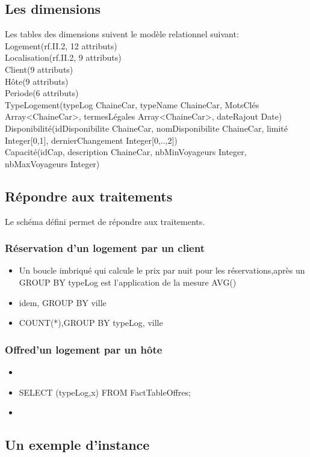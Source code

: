 \documentclass[11pt]{article}
\begin{document}
\subsection{Les dimensions}
Les tables des dimensions suivent le modèle relationnel suivant:\\
Logement(rf.II.2, 12 attributs)\\
Localisation(rf.II.2, 9 attributs)\\
Client(9 attributs)\\
Hôte(9 attributs)\\
Periode(6 attributs)\\
TypeLogement(typeLog ChaineCar, typeName ChaineCar, MotsClés Array<ChaineCar>, termesLégales Array<ChaineCar>, dateRajout Date)\\
Disponibilité(idDisponibilite ChaineCar, nomDisponibilite ChaineCar, limité Integer[0,1], dernierChangement Integer[0,..,2])\\
Capacité(idCap, description ChaineCar, nbMinVoyageurs Integer, nbMaxVoyageurs Integer)

\subsection{Répondre aux traitements}
Le schéma défini permet de répondre aux traitements.
\subsubsection*{Réservation d'un logement par un client}
\begin{itemize}
	\item Un boucle imbriqué qui calcule le prix par nuit pour les réservations,après un GROUP BY typeLog est l'application de la mesure AVG()
	\item idem, GROUP BY ville
	\item COUNT(*),GROUP BY typeLog, ville
\end{itemize}
\subsubsection*{Offred'un logement par un hôte}
\begin{itemize}
	\item 
	\item SELECT (typeLog,x) FROM FactTableOffres;
	\item 
\end{itemize}

\subsection{Un exemple d'instance}

\end{document}
